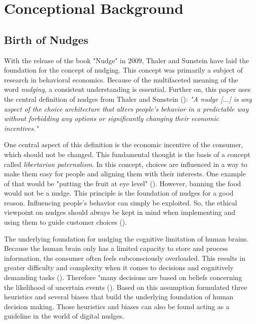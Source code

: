 \section{Conceptional Background}

\subsection{ Birth of Nudges}
With the release of the book "Nudge" in 2009, Thaler and Sunstein have laid the foundation for the concept of nudging. This concept was primarily a subject of research in behavioral economics. Because of the multifaceted meaning of the word \textit{nudging}, a consistent understanding is essential. Further on, this paper uses the central definition of nudges from Thaler and Sunstein (\citeyear[p.6]{thaler_nudge:_2009}): \textit{"A nudge [...] is any aspect of the choice architecture that alters people's behavior in a predictable way without forbidding any options or significantly changing their economic incentives."}

One central aspect of this definition is the economic incentive of the consumer, which should not be changed. This fundamental thought is the basis of a concept called \textit{libertarian paternalism}. In this concept, choices are influenced in a way to make them easy for people and aligning them with their interests. One example of that would be "putting the fruit at eye level" (\cite[p.6]{thaler_nudge:_2009}). However, banning the food would not be a nudge. This principle is the foundation of nudges for a good reason. Influencing people's behavior can simply be exploited. So, the ethical viewpoint on nudges should always be kept in mind when implementing and using them to guide customer choices (\cite{sunstein_nudging_2015}).

The underlying foundation for nudging the cognitive limitation of human brains. Because the human brain only has a limited capacity to store and process information, the consumer often feels subconsciously overloaded. This results in greater difficulty and complexity when it comes to decisions and cognitively demanding tasks (\cite{broniarczyk_decision_2014}). Therefore "many decisions are based on beliefs concerning the likelihood of uncertain events (\cite{tversky_judgment_1974}). Based on this assumption \cite{tversky_judgment_1974} formulated three heuristics and several biases that build the underlying foundation of human decision making. Those heuristics and biases can also be found acting as a guideline in the world of digital nudges.

